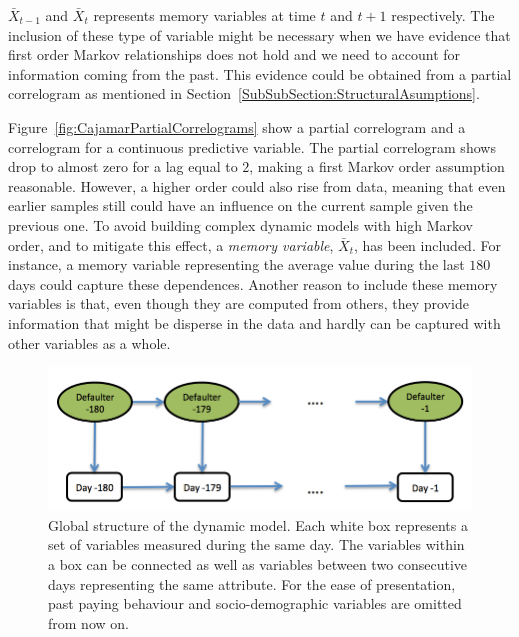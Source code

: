 $\bar{X}_{t-1}$ and $\bar{X}_{t}$ represents memory variables at time $t$ and $t+1$ respectively. The inclusion of these type of variable might be necessary when we have evidence that first order Markov relationships does not hold and we need to account for information coming from the past. This evidence could be obtained from a partial correlogram as mentioned in Section~\ref{SubSubSection:StructuralAsumptions}.

Figure~\ref{fig:CajamarPartialCorrelograms} show a partial correlogram and a correlogram for a continuous predictive variable. The partial correlogram shows drop to almost zero for a lag equal to $2$, making a first Markov order assumption reasonable. However, a higher order could also rise from data, meaning that even earlier samples still could have an influence on the current sample given the previous one. 
To avoid building complex dynamic models with high Markov order, and to mitigate this effect,  a \emph{memory variable}, $\bar{X}_t$, has been included. For instance, a memory variable representing the average value during the last $180$ days could capture these dependences. Another reason to include these memory variables is that, even though they are computed from others, they provide information that might be disperse in the data and hardly can be captured with other variables as a whole. 

\begin{figure}[htbp]
\begin{center}
\includegraphics[scale=0.45]{./figures/CajaMarModel1}
\caption{Global structure of the dynamic model. Each white box represents a set of variables measured during the same day. The variables within a box can be connected as well as variables between two consecutive days representing the same attribute. For the ease of presentation, past paying behaviour and socio-demographic variables are omitted from now on.}
\label{fig:global_temp}
\end{center}
\end{figure}

